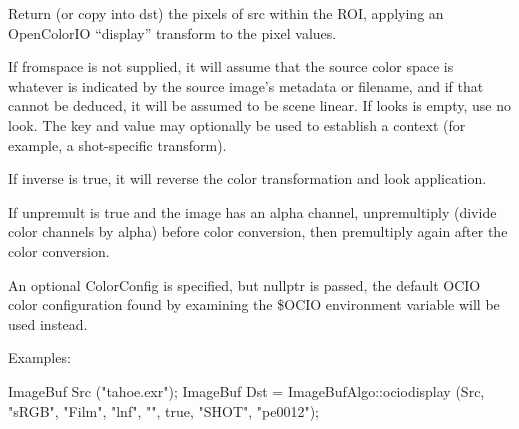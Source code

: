  
Return (or copy into {\cf dst}) the pixels of {\cf src} within the ROI,
applying an OpenColorIO ``display'' transform to the pixel values.

If {\cf fromspace} is not supplied, it will assume that the source color
space is whatever is indicated by the source image's metadata or filename,
and if that cannot be deduced, it will be assumed to be scene linear. If
{\cf looks} is empty, use no look. The {\cf key} and {\cf value} may
optionally be used to establish a context (for example, a shot-specific
transform).

If {\cf inverse} is {\cf true}, it will reverse the color transformation
and look application.

If {\cf unpremult} is {\cf true} and the image has an alpha channel,
unpremultiply (divide color channels by alpha) before color conversion, then
premultiply again after the color conversion.

An optional {\cf ColorConfig} is specified, but {\cf nullptr} is passed, the
default OCIO color configuration found by examining the {\cf \$OCIO}
environment variable will be used instead.

\smallskip
\noindent Examples:
\begin{code}
    ImageBuf Src ("tahoe.exr");
    ImageBuf Dst = ImageBufAlgo::ociodisplay (Src, "sRGB", "Film", "lnf",
                                              "", true, "SHOT", "pe0012");
\end{code}
\apiend


